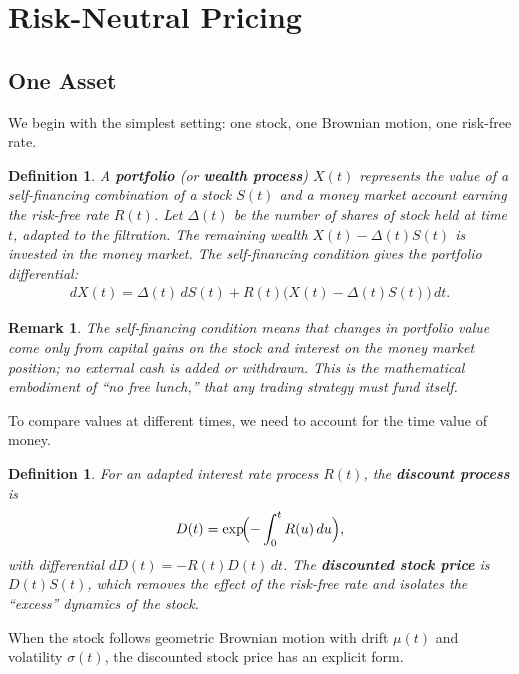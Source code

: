 \documentclass{report}
\theoremstyle{spacedplain}
\theoremstyle{spaceddefinition}
\newtheorem{definition}[theorem]{Definition}
\theoremstyle{spacedremark}
\newtheorem{remark}[theorem]{Remark}
\begin{document}
\section{Risk-Neutral Pricing}

\subsection{One Asset}

We begin with the simplest setting: one stock, one Brownian motion, one risk-free rate.

\begin{definition}
A \textbf{portfolio} (or \textbf{wealth process}) $X(t)$ represents the value of a self-financing combination of a stock $S(t)$ and a money market account earning the risk-free rate $R(t)$. Let $\Delta(t)$ be the number of shares of stock held at time $t$, adapted to the filtration. The remaining wealth $X(t) - \Delta(t)S(t)$ is invested in the money market. The self-financing condition gives the portfolio differential:
\begin{align}
    dX(t) = \Delta(t)\,dS(t) + R(t)\bigl(X(t) - \Delta(t)S(t)\bigr)\,dt.
\end{align}
\end{definition}

\begin{remark}
The self-financing condition means that changes in portfolio value come \emph{only} from capital gains on the stock and interest on the money market position; no external cash is added or withdrawn. This is the mathematical embodiment of ``no free lunch,'' that any trading strategy must fund itself.
\end{remark}

To compare values at different times, we need to account for the time value of money.

\begin{definition}
For an adapted interest rate process $R(t)$, the \textbf{discount process} is
\begin{align}
    D(t) = \exp\!\Bigl(-\int_0^t R(u)\,du\Bigr),
\end{align}
with differential $dD(t) = -R(t)D(t)\,dt$. The \textbf{discounted stock price} is $D(t)S(t)$, which removes the effect of the risk-free rate and isolates the ``excess'' dynamics of the stock.
\end{definition}

When the stock follows geometric Brownian motion with drift $\mu(t)$ and volatility $\sigma(t)$, the discounted stock price has an explicit form.
\end{document}
